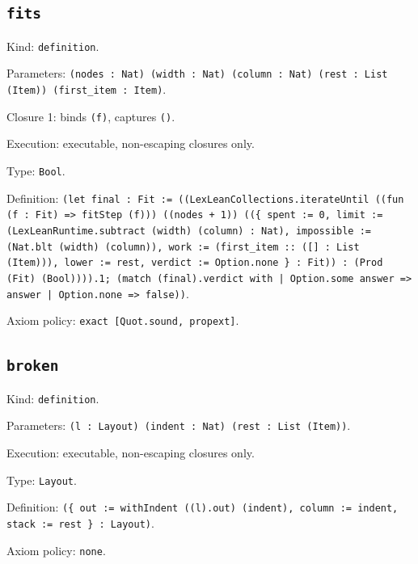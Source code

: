 \documentclass[11pt]{article}
\begin{document}
\subsection*{\texttt{fits}}
\noindent Kind: \texttt{definition}.\par
\noindent Parameters: \texttt{(nodes : Nat) (width : Nat) (column : Nat) (rest : List (Item)) (first\_item : Item)}.\par
\noindent Closure 1: binds \texttt{(f)}, captures \texttt{()}.\par
\noindent Execution: executable, non-escaping closures only.\par
\noindent Type: \texttt{Bool}.\par
\noindent Definition: \texttt{(let final : Fit := ((LexLeanCollections.iterateUntil ((fun (f : Fit) => fitStep (f))) ((nodes + 1)) ((\{ spent := 0, limit := (LexLeanRuntime.subtract (width) (column) : Nat), impossible := (Nat.blt (width) (column)), work := (first\_item :: ([] : List (Item))), lower := rest, verdict := Option.none \} : Fit)) : (Prod (Fit) (Bool)))).1; (match (final).verdict with | Option.some answer => answer | Option.none => false))}.\par
\noindent Axiom policy: \texttt{exact [Quot.sound, propext]}.\par
\subsection*{\texttt{broken}}
\noindent Kind: \texttt{definition}.\par
\noindent Parameters: \texttt{(l : Layout) (indent : Nat) (rest : List (Item))}.\par
\noindent Execution: executable, non-escaping closures only.\par
\noindent Type: \texttt{Layout}.\par
\noindent Definition: \texttt{(\{ out := withIndent ((l).out) (indent), column := indent, stack := rest \} : Layout)}.\par
\noindent Axiom policy: \texttt{none}.\par
\end{document}
